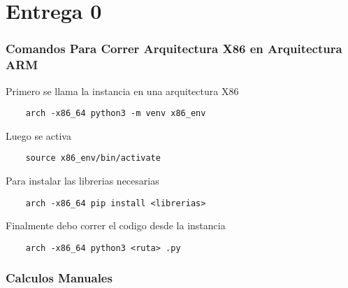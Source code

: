 \part{Entrega 0}

\section{Comandos Para Correr Arquitectura X86 en Arquitectura ARM}

Primero se llama la instancia en una arquitectura X86

\begin{verbatim}
    arch -x86_64 python3 -m venv x86_env
\end{verbatim}

Luego se activa

\begin{verbatim}
    source x86_env/bin/activate
\end{verbatim}

Para instalar las librerias necesarias

\begin{verbatim}
    arch -x86_64 pip install <librerias>
\end{verbatim}

Finalmente debo correr el codigo desde la instancia

\begin{verbatim}
    arch -x86_64 python3 <ruta> .py
\end{verbatim}


    


\section{Calculos Manuales}

